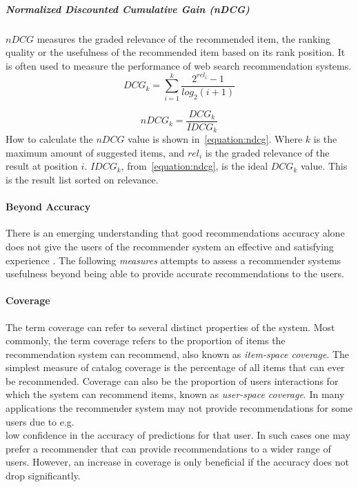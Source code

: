\subparagraph{Normalized Discounted Cumulative Gain (nDCG)}
\label{subp:normalized_discounted_cumulative_gain_}
$nDCG$ measures the graded relevance of the recommended item, the ranking quality or the usefulness of the recommended item based on its rank position.
It is often used to measure the performance of web search recommendation systems.
\begin{equation}
    DCG_k = \sum_{i=1}^{k}{\frac{2^{rel_i}-1}{log_2(i+1)}}
    \label{equation:dcg}
\end{equation}

\begin{equation}
    nDCG_k = \frac{DCG_k}{IDCG_k}
    \label{equation:ndcg}
\end{equation}
How to calculate the $nDCG$ value is shown in~\ref{equation:ndcg}.
Where $k$ is the maximum amount of suggested items, and $rel_i$ is the graded relevance of the result at position $i$.
$IDCG_k$, from~\ref{equation:ndcg}, is the ideal $DCG_k$ value.
This is the result list sorted on relevance.



\paragraph{Beyond Accuracy}
There is an emerging understanding that good recommendations accuracy alone does not give the users of the recommender system an effective and satisfying experience \cite{Herlocker2004}. The following \emph{measures} attempts to assess a recommender systems usefulness beyond being able to provide accurate recommendations to the users.

\paragraph{Coverage}
The term coverage can refer to several distinct properties of the system. Most
commonly, the term coverage refers to the proportion of items the
recommendation system can recommend, also known as \emph{item-space coverage}.
The simplest measure of catalog coverage is the percentage of all items that
can ever be recommended. Coverage can also be the proportion of users
interactions for which the system can recommend items, known as
\emph{user-space coverage}. In many applications the recommender system may not
provide recommendations for some users due to e.g.\\ low confidence in the
accuracy of predictions for that user. In such cases one may prefer a
recommender that can provide recommendations to a wider range of users. However, an increase in coverage is only beneficial if the accuracy does not drop significantly.

